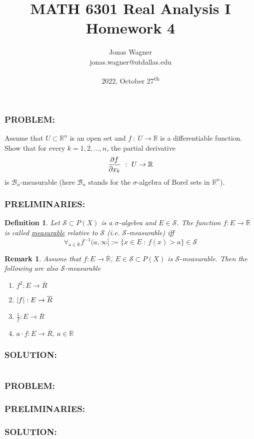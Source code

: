 \documentclass[]{article}
\title{MATH 6301 Real Analysis I \\ Homework 4}
\author{Jonas Wagner\\ jonas.wagner@utdallas.edu}
\date{2022, October 27\textsuperscript{th}}
\newcommand{\Problem}{\subsubsection*{\textbf{PROBLEM:}}}
\newcommand{\Solution}{\subsubsection*{\textbf{SOLUTION:}}}
\newcommand{\Preliminaries}{\subsubsection*{\textbf{PRELIMINARIES:}}}
\newcommand{\R}{\mathbb{R}}
\newcommand{\SigAlg}{\mathcal{S}}
\newcommand{\st}{\ : \ }
\newtheorem{definition}{Definition}
\newtheorem{remark}{Remark}
\begin{document}
\maketitle

\tableofcontents



\newpage
\section{}
\Problem
Assume that $U \subset \R^n$ is an open set and $f \st U \to \R$ is a differentiable function.
Show that for every $k = 1,2,\dots,n$, the partial derivative \[
    \pdv{f}{x_k} \st U \to \R
\] is $\mathcal{B}_n$-measurable (here $\mathcal{B}_n$ stands for the $\sigma$-algebra of Borel sets in $\R^n$).

\Preliminaries
\begin{definition}
    Let $\SigAlg \subset P(X)$ is a $\sigma$-algebra and $E \in \SigAlg$.
    The function $f : E \to \overline{\R}$ is called \emph{\underline{measurable}} relative to $\SigAlg$ (i.e. $\SigAlg$-measurable) iff \[
        \forall_{a \in \R} f^{-1}(a,\infty] := \{x \in E \st f(x) > a\} \in \SigAlg
    \] 
\end{definition}
\begin{remark}
    Assume that $f : E \to \overline{\R}$, $E \in \SigAlg \subset P(X)$ is $\SigAlg$-measurable.
    Then the following are also $\SigAlg$-measurable
    \begin{enumerate}
        \item $f^2 : E \to \overline{R}$
        \item $\abs{f} : E \to \overline{R}$
        \item $\frac{1}{f} : E \to \overline{R}$
        \item $a \cdot f : E \to \overline{R}, \ a \in \R$
    \end{enumerate}
\end{remark}

\Solution


\newpage
\section{}
\Problem


\Preliminaries



\Solution
\end{document}
